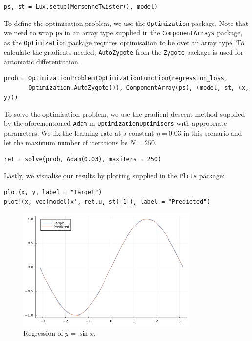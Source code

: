 \documentclass[a4paper,11pt,titlepage]{article}
\theoremstyle{definition}
\theoremstyle{plain}
\theoremstyle{remark}
\begin{document}
\begin{verbatim}
ps, st = Lux.setup(MersenneTwister(), model)
\end{verbatim}

To define the optimisation problem, we use the \verb|Optimization| package. Note that we need to wrap \verb|ps| in an array type supplied in the \verb|ComponentArrays| package, as the \verb|Optimization| package requires optimisation to be over an array type. To calculate the gradients needed, \verb|AutoZygote| from the \verb|Zygote| package is used for automatic differentiation.

\begin{verbatim}
prob = OptimizationProblem(OptimizationFunction(regression_loss,
       Optimization.AutoZygote()), ComponentArray(ps), (model, st, (x, y)))
\end{verbatim}

To solve the optimisation problem, we use the gradient descent method supplied by the aforementioned \verb|Adam| in \verb|OptimizationOptimisers| with appropriate parameters. We fix the learning rate at a constant $\eta = 0.03$ in this scenario and let the maximum number of iterations be $N = 250$.

\begin{verbatim}
ret = solve(prob, Adam(0.03), maxiters = 250)
\end{verbatim}

Lastly, we visualise our results by plotting supplied in the \verb|Plots| package:

\begin{verbatim}
plot(x, y, label = "Target")
plot!(x, vec(model(x', ret.u, st)[1]), label = "Predicted")
\end{verbatim}

\begin{figure}[htbp]
    \centering
    \includegraphics[width=0.8\textwidth]{figures/Regression.png}
    \caption{Regression of $y = \sin x$.}
    \label{fig:regression}
\end{figure}
\end{document}

